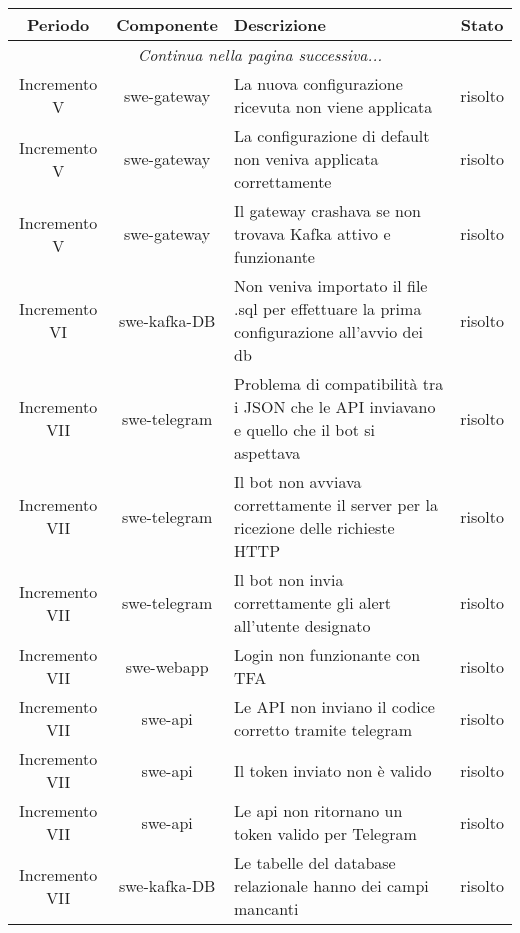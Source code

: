 	\begin{center}
		\begin{longtable}{|c|c|p{8cm}|c|}
		\hline
		\rowcolor{lighter-grayer}
		\textbf{Periodo} & \textbf{Componente} & \textbf{Descrizione} & \textbf{Stato} \\
		\hline
		\endhead
		\hline
        \multicolumn{4}{|c|}{\textit{Continua nella pagina successiva...}}\\
        \hline
        \endfoot
        \endlastfoot

		\hline


	    Incremento V & swe-gateway & La nuova configurazione ricevuta non viene applicata & risolto \\
	    \hline
	    Incremento V & swe-gateway & La configurazione di default non veniva applicata correttamente & risolto \\
	    \hline
	    Incremento V & swe-gateway & Il gateway crashava se non trovava Kafka attivo e funzionante & risolto \\
	    \hline
	    Incremento VI & swe-kafka-DB & Non veniva importato il file .sql per effettuare la prima configurazione all'avvio dei db & risolto \\
	    \hline
	    Incremento VII & swe-telegram & Problema di compatibilità tra i JSON che le API inviavano e quello che il bot si aspettava & risolto \\
	    \hline
	    Incremento VII & swe-telegram & Il bot non avviava correttamente il server per la ricezione delle richieste HTTP & risolto \\
	    \hline
	    Incremento VII & swe-telegram & Il bot non invia correttamente gli alert all'utente designato & risolto \\
	    \hline
	    Incremento VII & swe-webapp & Login non funzionante con TFA & risolto \\
	    \hline
	    Incremento VII & swe-api & Le API non inviano il codice corretto tramite telegram & risolto \\
	    \hline
	    Incremento VII & swe-api & Il token inviato non è valido & risolto \\
	    \hline
	    Incremento VII & swe-api & Le api non ritornano un token valido per Telegram & risolto \\
	    \hline
	    Incremento VII & swe-kafka-DB & Le tabelle del database relazionale hanno dei campi mancanti & risolto \\
	    \hline

\end{longtable}
\end{center}
